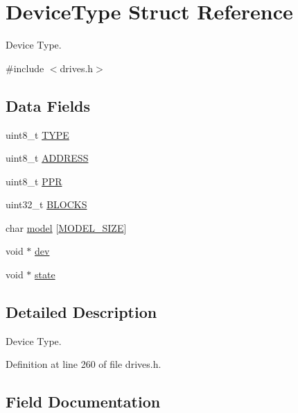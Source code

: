 \hypertarget{structDeviceType}{}\section{Device\+Type Struct Reference}
\label{structDeviceType}


Device Type.  




{\ttfamily \#include $<$drives.\+h$>$}

\subsection*{Data Fields}
\begin{DoxyCompactItemize}
\item 
uint8\+\_\+t \hyperlink{structDeviceType_acee5219162b6f47a9423b2086d127ede}{T\+Y\+PE}
\item 
uint8\+\_\+t \hyperlink{structDeviceType_a62529b7435785e39e8e7c5019303c2dd}{A\+D\+D\+R\+E\+SS}
\item 
uint8\+\_\+t \hyperlink{structDeviceType_ae0e59c6c17582ff80bdab3f2010e8d57}{P\+PR}
\item 
uint32\+\_\+t \hyperlink{structDeviceType_a29cbf84a3e9c8d01c8c77023ebf9c1f5}{B\+L\+O\+C\+KS}
\item 
char \hyperlink{structDeviceType_a47798e475b578d09f024fd983c69dfb6}{model} \mbox{[}\hyperlink{drives__sup_8h_a3f11d81c1e6d925611a9bdd5115064a0}{M\+O\+D\+E\+L\+\_\+\+S\+I\+ZE}\mbox{]}
\item 
void $\ast$ \hyperlink{structDeviceType_a59fc3b3cb45f8ee0cd1016bd64804d3b}{dev}
\item 
void $\ast$ \hyperlink{structDeviceType_ad0fc43d63606bab6c259047e36512e08}{state}
\end{DoxyCompactItemize}


\subsection{Detailed Description}
Device Type. 

Definition at line 260 of file drives.\+h.



\subsection{Field Documentation}
\mbox{\label{structDeviceType_a62529b7435785e39e8e7c5019303c2dd}} 
